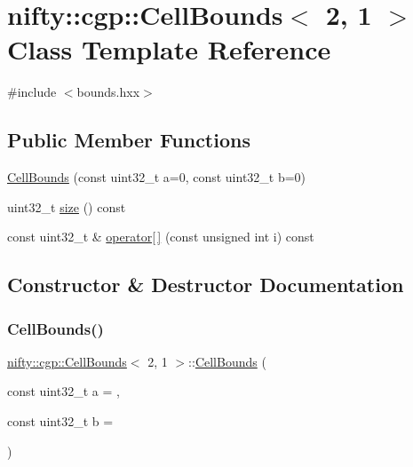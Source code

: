 \hypertarget{classnifty_1_1cgp_1_1CellBounds_3_012_00_011_01_4}{}\section{nifty\+:\+:cgp\+:\+:Cell\+Bounds$<$ 2, 1 $>$ Class Template Reference}
\label{classnifty_1_1cgp_1_1CellBounds_3_012_00_011_01_4}


{\ttfamily \#include $<$bounds.\+hxx$>$}

\subsection*{Public Member Functions}
\begin{DoxyCompactItemize}
\item 
\hyperlink{classnifty_1_1cgp_1_1CellBounds_3_012_00_011_01_4_a6a562932e154f461651c3bfb111ddd11}{Cell\+Bounds} (const uint32\+\_\+t a=0, const uint32\+\_\+t b=0)
\item 
uint32\+\_\+t \hyperlink{classnifty_1_1cgp_1_1CellBounds_3_012_00_011_01_4_ac39c866128b3b23a183050061d78df5b}{size} () const
\item 
const uint32\+\_\+t \& \hyperlink{classnifty_1_1cgp_1_1CellBounds_3_012_00_011_01_4_a52b2e95c087965d796e6562b6a7560b7}{operator\mbox{[}$\,$\mbox{]}} (const unsigned int i) const
\end{DoxyCompactItemize}


\subsection{Constructor \& Destructor Documentation}
\mbox{\label{classnifty_1_1cgp_1_1CellBounds_3_012_00_011_01_4_a6a562932e154f461651c3bfb111ddd11}} 
\subsubsection{\texorpdfstring{Cell\+Bounds()}{CellBounds()}}
{\footnotesize\ttfamily \hyperlink{classnifty_1_1cgp_1_1CellBounds}{nifty\+::cgp\+::\+Cell\+Bounds}$<$ 2, 1 $>$\+::\hyperlink{classnifty_1_1cgp_1_1CellBounds}{Cell\+Bounds} (\begin{DoxyParamCaption}\item[{const uint32\+\_\+t}]{a = {},  }\item[{const uint32\+\_\+t}]{b = {} }\end{DoxyParamCaption})\hspace{0.3cm}{\ttfamily [inline]}}



